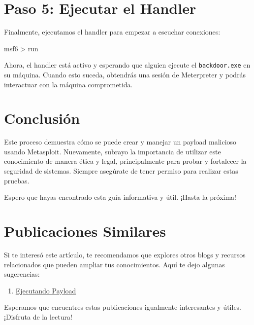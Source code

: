 \documentclass[
  jou,
  floatsintext,
  longtable,
  a4paper,
  nolmodern,
  notxfonts,
  notimes,
  colorlinks=true,linkcolor=blue,citecolor=blue,urlcolor=blue]{apa7}
\newenvironment{Shaded}{\begin{snugshade}}{\end{snugshade}}
\newcommand{\ExtensionTok}[1]{\textcolor[rgb]{0.00,0.23,0.31}{#1}}
\newcommand{\NormalTok}[1]{\textcolor[rgb]{0.00,0.23,0.31}{#1}}
\newcommand{\OperatorTok}[1]{\textcolor[rgb]{0.37,0.37,0.37}{#1}}
\providecommand{\tightlist}{%
  \setlength{\itemsep}{0pt}\setlength{\parskip}{0pt}}
\begin{document}
\section{Paso 5: Ejecutar el Handler}\label{paso-5-ejecutar-el-handler}

Finalmente, ejecutamos el handler para empezar a escuchar conexiones:

\begin{Shaded}
\begin{Highlighting}[]
\ExtensionTok{msf6} \OperatorTok{\textgreater{}}\NormalTok{ run}
\end{Highlighting}
\end{Shaded}

Ahora, el handler está activo y esperando que alguien ejecute el
\texttt{backdoor.exe} en su máquina. Cuando esto suceda, obtendrás una
sesión de Meterpreter y podrás interactuar con la máquina comprometida.

\section{Conclusión}\label{conclusiuxf3n}

Este proceso demuestra cómo se puede crear y manejar un payload
malicioso usando Metasploit. Nuevamente, subrayo la importancia de
utilizar este conocimiento de manera ética y legal, principalmente para
probar y fortalecer la seguridad de sistemas. Siempre asegúrate de tener
permiso para realizar estas pruebas.

Espero que hayas encontrado esta guía informativa y útil. ¡Hasta la
próxima!

\section{Publicaciones Similares}\label{publicaciones-similares}

Si te interesó este artículo, te recomendamos que explores otros blogs y
recursos relacionados que pueden ampliar tus conocimientos. Aquí te dejo
algunas sugerencias:

\begin{enumerate}
\def\labelenumi{\arabic{enumi}.}
\tightlist
\item
  \href{https://achalmaedison.netlify.app/tecnologia-seguridad/ciberseguridad-ethical-hacking-ceh/2024-09-03-ejecutando-payload/index.pdf}{}
  \href{https://achalmaedison.netlify.app/tecnologia-seguridad/ciberseguridad-ethical-hacking-ceh/2024-09-03-ejecutando-payload}{Ejecutando
  Payload}
\end{enumerate}

Esperamos que encuentres estas publicaciones igualmente interesantes y
útiles. ¡Disfruta de la lectura!
\end{document}

